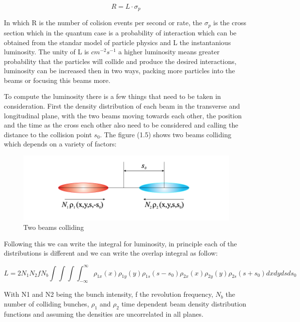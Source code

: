 \begin{equation}
R = L \cdot \sigma_{p} 
\end{equation}

In which R is the number of colision events per second or rate, the $\sigma_{p}$ is the cross section which in the quantum case is a probability of interaction which can be obtained from the standar model of particle physics and L the instantanious luminosity. The unity of L is  $cm^{-2} s^{-1}$ a higher luminosity means greater probability that the particles will collide and produce the desired interactions, luminosity can be increased then in two ways, packing more particles into the beams or focusing this beams more.  

To compute the luminosity there is a few things that need to be taken in consideration. First the density distribution of each beam in the transverse and longitudinal plane, with the two beams moving towards each other, the position and the time as the cross each other also need to be considered and calling the distance to the collision point $s_{0}$. The figure (1.5) shows two beams colliding which depends on a variety of factors:


\begin{figure}[h]
    \centering
    \includegraphics[width=1\textwidth]{lumi.png}
    \caption{Two beams colliding}
    \label{fig:beamslumi}
\end{figure}


Following this we can write the integral for luminosity, in principle each of the distributions is different and we can write the overlap integral as follow:

\begin{equation}
 L = 2N_{1}N_{2}fN_{b} \int \int \int \int^{\infty}_{-\infty}  \rho_{1x} (x) \rho_{1y}(y) \rho_{1s} (s-s_{0}) \rho_{2x}(x) \rho_{2y}(y) \rho_{2s} (s+s_{0}) dxdydsds_{0}  
\end{equation}

With N1 and N2 being the bunch intensity, f the revolution frequency, $N_{b}$ the number of colliding bunches, $\rho_{1}$ and $\rho_{2}$ time dependent beam density distribution functions and assuming the densities are uncorrelated in all planes.  \cite{Lumvdm}

